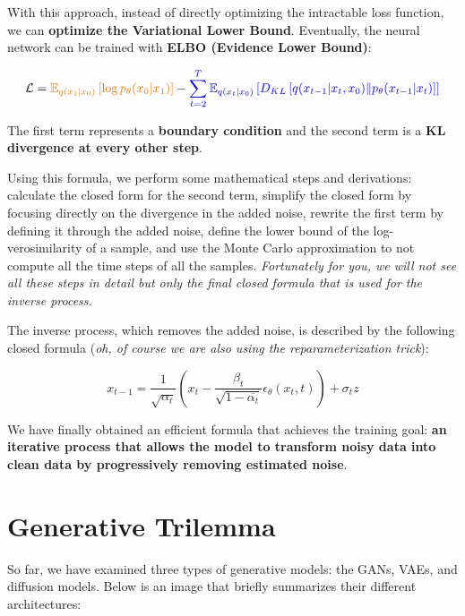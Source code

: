 With this approach, instead of directly optimizing the intractable loss function, we can \textbf{optimize the Variational Lower Bound}. Eventually, the neural network can be trained with \textbf{ELBO (Evidence Lower Bound)}:

$$
\mathcal{L} = \textcolor{myorange}{\mathbb{E}_{q(x_1 | x_0)} \left[ \log p_{\theta}(x_0 | x_1) \right]} - \textcolor{myblue}{\sum_{t=2}^{T} \mathbb{E}_{q(x_t | x_0)} \left[ D_{KL} \left[ q(x_{t-1} | x_t, x_0) \| p_{\theta}(x_{t-1} | x_t) \right] \right]}
$$

The first term represents a \textbf{\textcolor{myorange}{boundary condition}} and the second term is a \textbf{\textcolor{myblue}{KL divergence at every other step}}.

Using this formula, we perform some mathematical steps and derivations: calculate the closed form for the second term, simplify the closed form by focusing directly on the divergence in the added noise, rewrite the first term by defining it through the added noise, define the lower bound of the log-verosimilarity of a sample, and use the Monte Carlo approximation to not compute all the time steps of all the samples. \textit{Fortunately for you, we will not see all these steps in detail but only the final closed formula that is used for the inverse process.}

The inverse process, which removes the added noise, is described by the following closed formula (\textit{oh, of course we are also using the reparameterization trick}):

$$
x_{t-1} = \frac{1}{\sqrt{\alpha_t}} \left( x_t - \frac{\beta_t}{\sqrt{1 - \overline{\alpha_t}}} \epsilon_{\theta}(x_t, t) \right) + \sigma_t z
$$

We have finally obtained an efficient formula that achieves the training goal: \textbf{an iterative process that allows the model to transform noisy data into clean data by progressively removing estimated noise}.


\section{Generative Trilemma}

So far, we have examined three types of generative models: the GANs, VAEs, and diffusion models. Below is an image that briefly summarizes their different architectures:

